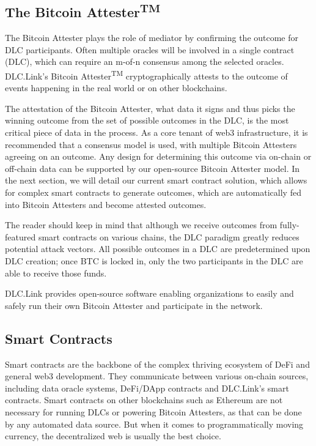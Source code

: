 \documentclass[twoside, a4paper, 11pt]{article}
\begin{document}
  \subsection{The Bitcoin Attester\textsuperscript{TM}}

  The Bitcoin Attester plays the role of mediator by confirming the outcome for DLC participants. Often multiple oracles will be involved in a single contract (DLC), which can require an m-of-n consensus among the selected oracles. DLC.Link’s Bitcoin Attester\textsuperscript{TM} cryptographically attests to the outcome of events happening in the real world or on other blockchains.

  The attestation of the Bitcoin Attester, what data it signs and thus picks the winning outcome from the set of possible outcomes in the DLC, is the most critical piece of data in the process. As a core tenant of web3 infrastructure, it is recommended that a consensus model is used, with multiple Bitcoin Attesters agreeing on an outcome. Any design for determining this outcome via on-chain or off-chain data can be supported by our open-source Bitcoin Attester model. In the next section, we will detail our current smart contract solution, which allows for complex smart contracts to generate outcomes, which are automatically fed into Bitcoin Attesters and become attested outcomes.

  The reader should keep in mind that although we receive outcomes from fully-featured smart contracts on various chains, the DLC paradigm greatly reduces potential attack vectors. All possible outcomes in a DLC are predetermined upon DLC creation; once BTC is locked in, only the two participants in the DLC are able to receive those funds.

  DLC.Link provides open-source software enabling organizations to easily and safely run their own Bitcoin Attester and participate in the network.

  \subsection{Smart Contracts}

  Smart contracts are the backbone of the complex thriving ecosystem of DeFi and general web3 development. They communicate between various on-chain sources, including data oracle systems, DeFi/DApp contracts and DLC.Link’s smart contracts. Smart contracts on other blockchains such as Ethereum are not necessary for running DLCs or powering Bitcoin Attesters, as that can be done by any automated data source. But when it comes to programmatically moving currency, the decentralized web is usually the best choice.
\end{document}
